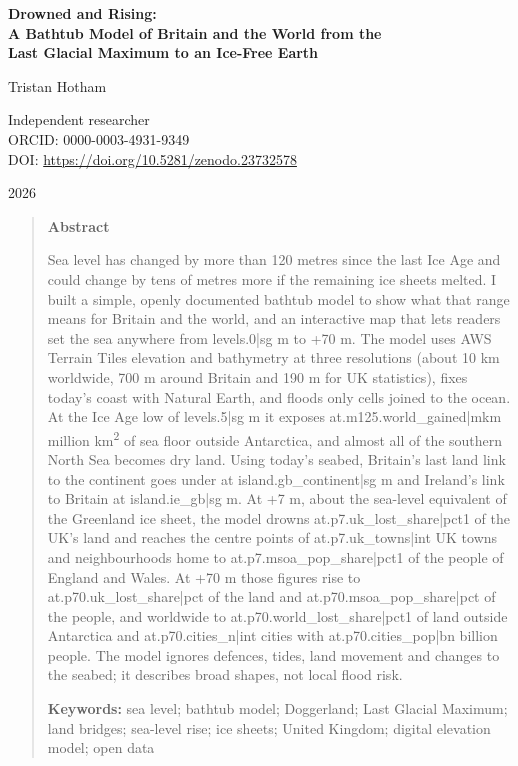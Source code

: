 \documentclass[11pt,a4paper]{article}
\begin{document}
\begin{center}
{\Large\bfseries Drowned and Rising:\\[2pt] A Bathtub Model of Britain and the World from the\\[2pt] Last Glacial Maximum to an Ice-Free Earth\par}
\vspace{1.2em}
{\large Tristan Hotham\par}
\vspace{0.3em}
{\small Independent researcher\\
ORCID: 0000-0003-4931-9349\\
DOI: \href{https://doi.org/10.5281/zenodo.23732578}{https://doi.org/10.5281/zenodo.23732578}\par}
\vspace{0.8em}
2026
\end{center}

\begin{quote}
\small
\begin{center}\textbf{Abstract}\end{center}
Sea level has changed by more than 120 metres since the last Ice Age and could change by tens of metres more if the remaining ice sheets melted. I built a simple, openly documented bathtub model to show what that range means for Britain and the world, and an interactive map that lets readers set the sea anywhere from {{levels.0|sg}} m to +70 m. The model uses AWS Terrain Tiles elevation and bathymetry at three resolutions (about 10 km worldwide, 700 m around Britain and 190 m for UK statistics), fixes today's coast with Natural Earth, and floods only cells joined to the ocean. At the Ice Age low of {{levels.5|sg}} m it exposes {{at.m125.world_gained|mkm}} million km\textsuperscript{2} of sea floor outside Antarctica, and almost all of the southern North Sea becomes dry land. Using today's seabed, Britain's last land link to the continent goes under at {{island.gb_continent|sg}} m and Ireland's link to Britain at {{island.ie_gb|sg}} m. At +7 m, about the sea-level equivalent of the Greenland ice sheet, the model drowns {{at.p7.uk_lost_share|pct1}} of the UK's land and reaches the centre points of {{at.p7.uk_towns|int}} UK towns and neighbourhoods home to {{at.p7.msoa_pop_share|pct1}} of the people of England and Wales. At +70 m those figures rise to {{at.p70.uk_lost_share|pct}} of the land and {{at.p70.msoa_pop_share|pct}} of the people, and worldwide to {{at.p70.world_lost_share|pct1}} of land outside Antarctica and {{at.p70.cities_n|int}} cities with {{at.p70.cities_pop|bn}} billion people. The model ignores defences, tides, land movement and changes to the seabed; it describes broad shapes, not local flood risk.

\textbf{Keywords:} sea level; bathtub model; Doggerland; Last Glacial Maximum; land bridges; sea-level rise; ice sheets; United Kingdom; digital elevation model; open data
\end{quote}
\end{document}
